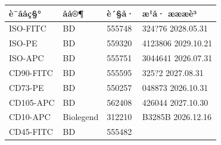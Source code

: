 \documentclass[UTF8,10pt,a4paper,fontset=fandol]{ctexart}
\newcommand{\fieldvalue}[1]{#1}
\newcommand{\handwritten}[1]{#1}
\begin{document}
\begin{center}
\small
\begin{tabularx}{\textwidth}{|p{}|p{}|X|X|}
\hline
è¯ååç§° & åå®¶ & è´§å· & æ¹å· \quad\quad æææè³ \\ \hline
ISO-FITC & BD & 555748 &
\fieldvalue{\handwritten{324?76}}\quad
\fieldvalue{\handwritten{2028.05.31}} \\ \hline
ISO-PE & BD & 559320 &
\fieldvalue{\handwritten{4123806}}\quad
\fieldvalue{\handwritten{2029.10.21}} \\ \hline
ISO-APC & BD & 555751 &
\fieldvalue{\handwritten{3044641}}\quad
\fieldvalue{\handwritten{2026.07.31}} \\ \hline
CD90-FITC & BD & 555595 &
\fieldvalue{\handwritten{325?2}}\quad
\fieldvalue{\handwritten{2027.08.31}} \\ \hline
CD73-PE & BD & 550257 &
\fieldvalue{\handwritten{048873}}\quad
\fieldvalue{\handwritten{2026.10.31}} \\ \hline
CD105-APC & BD & 562408 &
\fieldvalue{\handwritten{426044}}\quad
\fieldvalue{\handwritten{2027.10.30}} \\ \hline
CD10-APC & Biolegend & 312210 &
\fieldvalue{\handwritten{B3285B}}\quad
\fieldvalue{\handwritten{2026.12.16}} \\ \hline
CD45-FITC & BD & 555482 &

\end{tabularx}
\end{center}
\end{document}
